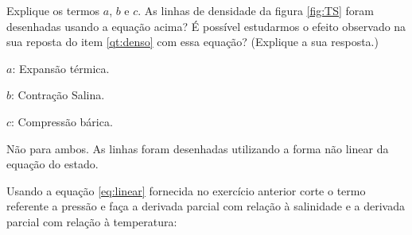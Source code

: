 \documentclass[letterpaper,portuguese,12pt,pdftex]{exam}
\newcommand{\pd}[2]{\frac{\partial #1}{\partial #2}}
\begin{document}
\begin{questions}
\begin{parts}
  Explique os termos $a$, $b$ e $c$.  As linhas de densidade da figura
  \ref{fig:TS} foram desenhadas usando a equação acima?  É possível estudarmos o
  efeito observado na sua reposta do item \ref{qt:denso} com essa equação?
  (Explique a sua resposta.)

  \begin{solution}
  $a$: Expansão térmica.

  $b$: Contração Salina.

  $c$: Compressão bárica.
  \end{solution}

  \begin{solution}
  Não para ambos.  As linhas foram desenhadas utilizando a forma não linear da equação
  do estado.
  \end{solution}
\end{parts}

\question
 Usando a equação \ref{eq:linear} fornecida no exercício anterior corte o termo
 referente a pressão e faça a derivada parcial com relação à salinidade e a
 derivada parcial com relação à temperatura:
\end{questions}
\end{document}

